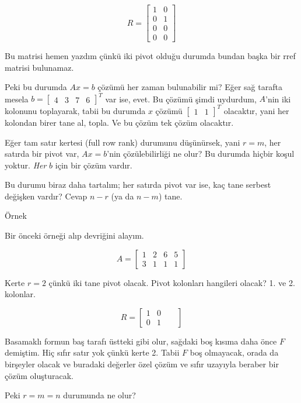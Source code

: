 \documentclass[12pt,fleqn]{article}\usepackage{../../common}
\begin{document}
$$ R = 
\left[\begin{array}{rr}
1 & 0 \\
0 & 1 \\
0 & 0 \\
0 & 0 
\end{array}\right]
 $$

Bu matrisi hemen yazdım çünkü iki pivot olduğu durumda bundan başka bir
rref matrisi bulunamaz. 

Peki bu durumda $Ax=b$ çözümü her zaman bulunabilir mi? Eğer sağ tarafta 
mesela $b = \left[\begin{array}{rrrr}4 & 3 & 7 & 6 \end{array}\right]^T$ 
var ise, evet. Bu çözümü şimdi uydurdum, $A$'nin iki 
kolonunu toplayarak, tabii bu durumda $x$ çözümü $\left[\begin{array}{rr} 1
 & 1\end{array}\right]^T$ olacaktır, yani 
her kolondan birer tane al, topla. Ve bu çözüm tek çözüm olacaktır. 

Eğer tam satır kertesi (full row rank) durumunu düşünürsek, yani $r = m$,
her satırda bir pivot var, $Ax=b$'nin çözülebilirliği ne olur? Bu durumda
hiçbir koşul yoktur. {\em Her} $b$ için bir çözüm vardır. 

Bu durumu biraz daha tartalım; her satırda pivot var ise, kaç tane serbest
değişken vardır? Cevap $n-r$ (ya da $n-m$) tane. 

Örnek 

Bir önceki örneği alıp devriğini alayım. 

$$ 
A = 
\left[\begin{array}{rrrr}
1 & 2 & 6 & 5 \\
3 & 1 & 1 & 1 
\end{array}\right]
 $$

Kerte $r=2$ çünkü iki tane pivot olacak. Pivot kolonları hangileri olacak?
1. ve 2. kolonlar. 

$$ 
R = 
\left[\begin{array}{rrrr}
1 & 0 & &    \\
0 & 1 & &
\end{array}\right]
 $$

Basamaklı formun baş tarafı üstteki gibi olur, sağdaki boş kısıma daha
önce $F$ demiştim. Hiç sıfır satır yok çünkü kerte 2. Tabii $F$ boş
olmayacak, orada da birşeyler olacak ve buradaki değerler özel çözüm ve
sıfır uzayıyla beraber bir çözüm oluşturacak. 

Peki $r = m = n$ durumunda ne olur? 
\end{document}
